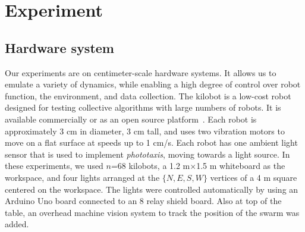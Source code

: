 
\section{Experiment}\label{sec:expResults}



\subsection{Hardware system}


Our experiments are on centimeter-scale hardware systems.  It allows us to emulate a variety of dynamics, while enabling a high degree of control over robot function, the environment, and data collection. The kilobot \cite{Rubenstein2012,rubenstein2014programmable} is a low-cost robot designed for testing collective algorithms with large numbers of robots. It is available commercially or as an open source platform~\cite{K-Team2015}.  Each robot is approximately 3 cm in diameter, 3 cm tall, and uses two vibration motors to move on a flat surface at speeds up to 1 cm/s.  Each robot has one ambient light sensor that is used to implement \emph{phototaxis},  moving towards a light source. 
In these experiments, we used $n$=68 kilobots, a 1.2 m$\times$1.5 m whiteboard as the workspace, and four lights arranged at the $\{N,E,S,W\}$ vertices of a 4 m square centered on the workspace. The lights were controlled automatically by using an Arduino Uno board connected to an 8 relay shield board. Also at top of the table, an overhead machine vision system to track the position of the swarm was added.
